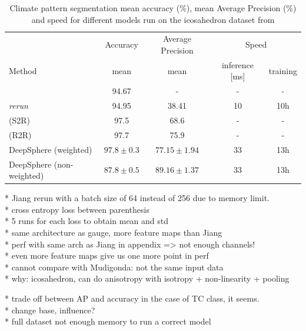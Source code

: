 \documentclass{article} %
\begin{document}
\begin{table}
	\begin{tabular}{l|c c c c}
	\multicolumn{1}{l}{} & Accuracy & Average Precision & \multicolumn{2}{c}{Speed}\\
	\cmidrule(lr){2-2} \cmidrule(lr){3-3} \cmidrule(lr){4-5}
	\multicolumn{1}{l}{Method} & mean & mean & inference [ms] & training \\ \hline
	\cite{jiang2019sphericalcnn} & 94.67 & - & - & -\\
	\cite{jiang2019sphericalcnn} \emph{rerun} & 94.95 & 38.41 & 10 & 10h\\
	\cite{cohen2019gauge} (S2R) & 97.5 & 68.6 & - & -\\
	\cite{cohen2019gauge} (R2R) & 97.7 & 75.9 & - & -\\ \hline
	DeepSphere (weighted) & $97.8\pm 0.3$ & $77.15\pm 1.94$ & 33 & 13h \\
	DeepSphere (non-weighted) & $87.8\pm 0.5$ & $89.16\pm 1.37$ & 33 & 13h\\
	\end{tabular}
	\caption{Climate pattern segmentation mean accuracy (\%), mean Average Precision (\%) and speed for different models run on the icosahedron dataset from \cite{jiang2019sphericalcnn}}
\end{table}

* Jiang rerun with a batch size of 64 instead of 256 due to memory limit.\\
* cross entropy loss between parenthesis\\
* 5 runs for each loss to obtain mean and std\\
* same architecture as gauge, more feature maps than Jiang\\
* perf with same arch as Jiang in appendix => not enough channels!\\
* even more feature maps give us one more point in perf\\
* cannot compare with Mudigonda: not the same input data\\
* why: icosahedron, can do anisotropy with isotropy + non-linearity + pooling

* trade off between AP and accuracy in the case of TC class, it seems.\\
* change base, influence?\\

* full dataset not enough memory to run a correct model
\end{document}
